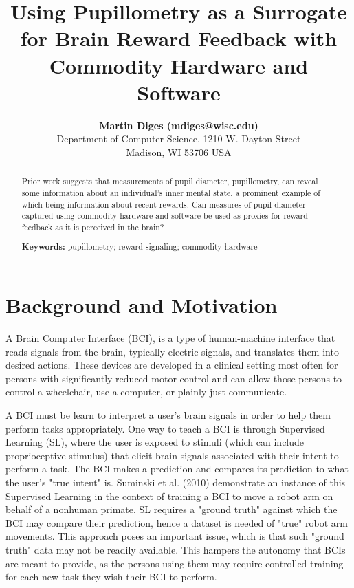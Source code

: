 \documentclass[10pt,letterpaper]{article}
\title{Using Pupillometry as a Surrogate for Brain Reward Feedback with Commodity Hardware and Software}
\author{{\large \bf Martin Diges (mdiges@wisc.edu)} \\
    Department of Computer Science, 1210 W. Dayton Street \\
    Madison, WI 53706 USA
    }
\begin{document}
\maketitle


\begin{abstract}
Prior work suggests that measurements of pupil diameter, pupillometry, can reveal some information about an individual's inner mental state, a prominent example of which being information about recent rewards. Can measures of pupil diameter captured using commodity hardware and software be used as proxies for reward feedback as it is perceived in the brain? 

\textbf{Keywords:} 
pupillometry; reward signaling; commodity hardware
\end{abstract}

\section{Background and Motivation}
A Brain Computer Interface (BCI), is a type of human-machine interface that reads signals from the brain, typically electric signals, and translates them into desired actions. These devices are developed in a clinical setting most often for persons with significantly reduced motor control and can allow those persons to control a wheelchair, use a computer, or plainly just communicate.

A BCI must be learn to interpret a user's brain signals in order to help them perform tasks appropriately. One way to teach a BCI is through Supervised Learning (SL), where the user is exposed to stimuli (which can include proprioceptive stimulus) that elicit brain signals associated with their intent to perform a task. The BCI makes a prediction and compares its prediction to what the user's "true intent" is. Suminski et al. (2010) demonstrate an instance of this Supervised Learning in the context of training a BCI to move a robot arm on behalf of a nonhuman primate. SL requires a "ground truth" against which the BCI may compare their prediction, hence a dataset is needed of "true" robot arm movements. This approach poses an important issue, which is that such "ground truth" data may not be readily available. This hampers the autonomy that BCIs are meant to provide, as the persons using them may require controlled training for each new task they wish their BCI to perform. 
\end{document}
